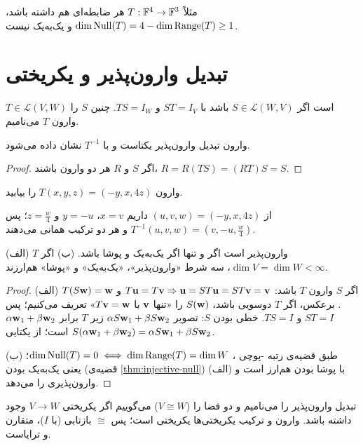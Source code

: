 مثلاً $T:\mathbb{F}^4\to\mathbb{F}^3$ هر ضابطه‌ای هم داشته باشد، $\dim\operatorname{Null}(T)=4-\dim\operatorname{Range}(T)\ge1$ و یک‌به‌یک نیست.

\section{تبدیل وارون‌پذیر و یکریختی}

\begin{definition}
$T\in\mathcal{L}(V,W)$  است اگر $S\in\mathcal{L}(W,V)$ باشد با $ST=I_V$ و $TS=I_W$. چنین $S$ را وارون  $T$ می‌نامیم.
\end{definition}

\begin{theorem}\label{thm:map-inverse-unique}
وارون تبدیل وارون‌پذیر یکتاست و با $T^{-1}$ نشان داده می‌شود.
\end{theorem}
\begin{proof}
اگر $S$ و $R$ هر دو وارون باشند، $R=R(TS)=(RT)S=S$.
\end{proof}

\begin{example}
وارون $T(x,y,z)=(-y,x,4z)$ را بیابید.
\end{example}
\begin{solution}
از $(u,v,w)=(-y,x,4z)$ داریم $x=v$، $y=-u$ و $z=\frac w4$؛ پس $T^{-1}(u,v,w)=(v,-u,\frac w4)$ و هر دو ترکیب همانی می‌دهند.
\end{solution}

\begin{theorem}\label{thm:invertible-bijective}
(الف) $T$ وارون‌پذیر است اگر و تنها اگر یک‌به‌یک و پوشا باشد.
(ب) اگر $\dim V=\dim W<\infty$، سه شرط «وارون‌پذیر»، «یک‌به‌یک» و «پوشا» هم‌ارزند.
\end{theorem}
\begin{proof}
(الف) اگر $S$ وارون $T$ باشد: $T\mathbf{u}=T\mathbf{v}\Rightarrow\mathbf{u}=ST\mathbf{u}=ST\mathbf{v}=\mathbf{v}$ و $T(S\mathbf{w})=\mathbf{w}$. برعکس، اگر $T$ دوسویی باشد، $S(\mathbf{w})$ را «تنها $\mathbf{v}$ با $T\mathbf{v}=\mathbf{w}$» تعریف می‌کنیم؛ پس $ST=I$ و $TS=I$. خطی بودن $S$: تصویر $\alpha S\mathbf{w}_1+\beta S\mathbf{w}_2$ زیر $T$ برابر $\alpha\mathbf{w}_1+\beta\mathbf{w}_2$ است؛ از یکتایی $S(\alpha\mathbf{w}_1+\beta\mathbf{w}_2)=\alpha S\mathbf{w}_1+\beta S\mathbf{w}_2$.

(ب) طبق قضیه‌ی رتبه -پوچی ، $\dim\operatorname{Null}(T)=0\iff\dim\operatorname{Range}(T)=\dim W$؛ یعنی یک‌به‌یک بودن (قضیه‌ی \ref{thm:injective-null}) با پوشا بودن هم‌ارز است و (الف) وارون‌پذیری را می‌دهد.
\end{proof}

\begin{definition}[یکریختی]
تبدیل وارون‌پذیر را  می‌نامیم و دو فضا را  ($V\cong W$) می‌گوییم اگر یکریختی $V\to W$ وجود داشته باشد. وارون و ترکیب یکریختی‌ها یکریختی است؛ پس $\cong$ بازتابی (با $I$)، متقارن  و ترایاست.
\end{definition}

